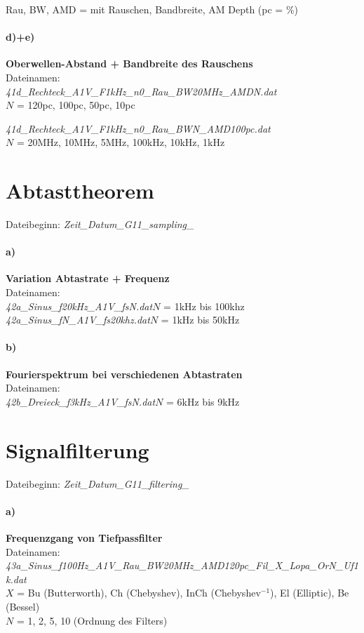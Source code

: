 Rau, BW, AMD = mit Rauschen, Bandbreite, AM Depth (pc = \%)

\paragraph{d)+e)}\textbf{Oberwellen-Abstand + Bandbreite des Rauschens}\\
Dateinamen:\\
\textit{41d\_Rechteck\_A1V\_F1kHz\_n0\_Rau\_BW20MHz\_AMDN.dat} \\$N$ = 120pc, 100pc, 50pc, 10pc

\textit{41d\_Rechteck\_A1V\_F1kHz\_n0\_Rau\_BWN\_AMD100pc.dat} \\$N$ = 20MHz, 10MHz, 5MHz, 100kHz, 10kHz, 1kHz

\section*{Abtasttheorem}
Dateibeginn: \textit{Zeit\_Datum\_G11\_sampling\_}
\paragraph{a)}\textbf{Variation Abtastrate + Frequenz}\\
Dateinamen:\\
\textit{42a\_Sinus\_f20kHz\_A1V\_fsN.dat}\tab $N$ = 1kHz bis 100khz\\
\textit{42a\_Sinus\_fN\_A1V\_fs20khz.dat}\tab $N$ = 1kHz bis 50kHz

\paragraph{b)}\textbf{Fourierspektrum bei verschiedenen Abtastraten}\\
Dateinamen:\\
\textit{42b\_Dreieck\_f3kHz\_A1V\_fsN.dat}\tab $N$ = 6kHz bis 9kHz

\section*{Signalfilterung}
Dateibeginn: \textit{Zeit\_Datum\_G11\_filtering\_}
\paragraph{a)}\textbf{Frequenzgang von Tiefpassfilter}\\
Dateinamen:\\
\textit{43a\_Sinus\_f100Hz\_A1V\_Rau\_BW20MHz\_AMD120pc\_Fil\_X\_Lopa\_OrN\_Uf1k.dat}\\
$X$ = Bu (Butterworth), Ch (Chebyshev), InCh (Chebyshev$^{-1}$), El (Elliptic), Be (Bessel)\\
$N$ = 1, 2, 5, 10 (Ordnung des Filters)

